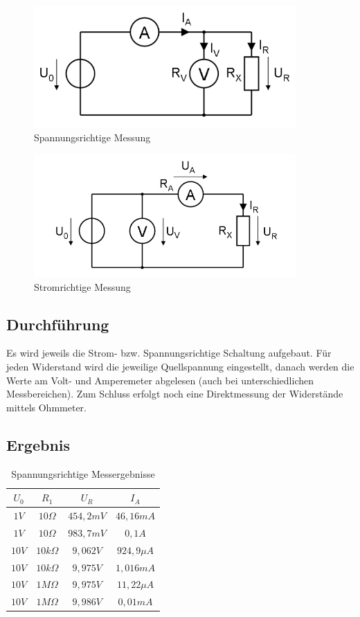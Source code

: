 \documentclass[12pt,a4paper,titlepage]{article}
\begin{document}
\begin{figure}[H]
  \centering
  \label{Figure2.3.1}
  \includegraphics[width=100mm]{spannungsrichtig.png}
  \caption{Spannungsrichtige Messung}
\end{figure}

\begin{figure}[H]
  \centering
  \label{Figure2.3.2}
  \includegraphics[width=100mm]{stromrichtig.png}
  \caption{Stromrichtige Messung}
\end{figure}


\subsection{Durchführung}
Es wird jeweils die Strom- bzw. Spannungsrichtige Schaltung aufgebaut. Für jeden Widerstand wird die jeweilige Quellspannung eingestellt, danach werden die Werte am Volt- und Amperemeter abgelesen (auch bei unterschiedlichen Messbereichen). Zum Schluss erfolgt noch eine Direktmessung der Widerstände mittels Ohmmeter.

\subsection{Ergebnis}
\begin{table}[H]
  \centering
  \label{Figure2.5.1}
  \begin{tabular}{c|c|c|c}
    $U_0$ & $R_1$ & $U_R$ & $I_A$ \\
    \hline
    $1V$ & $10\Omega$ & $454,2mV$ & $46,16mA$ \\
    \hline
    $1V$ & $10\Omega$ & $983,7mV$ & $0,1A$ \\
    \hline
    $10V$ & $10k\Omega$ & $9,062V$ & $924,9\mu A$ \\
    \hline
    $10V$ & $10k\Omega$ & $9,975V$ & $1,016mA$ \\
    \hline
    $10V$ & $1M\Omega$ & $9,975V$ & $11,22\mu A$ \\
    \hline
    $10V$ & $1M\Omega$ & $9,986V$ & $0,01mA$
  \end{tabular}
  \caption{Spannungsrichtige Messergebnisse}
\end{table}
\end{document}
